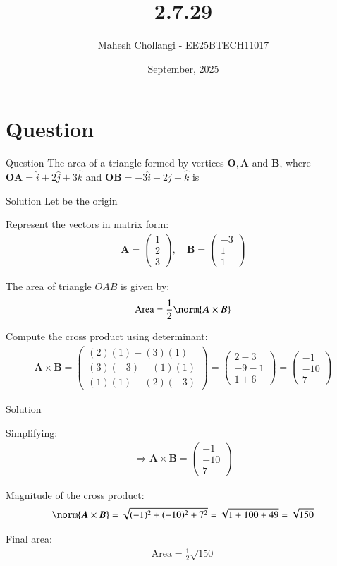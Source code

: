 \documentclass{beamer}
\title{2.7.29}
\date{September, 2025}
\author{Mahesh Chollangi - EE25BTECH11017}
\newcommand{\myvec}[1]{\ensuremath{\begin{pmatrix}#1\end{pmatrix}}}
\renewcommand{\vec}[1]{\boldsymbol{#1}} %
\begin{document}
\frame{\titlepage}

\section*{Question}
\begin{frame}{Question}
The area of a triangle formed by vertices $\vec{O}, \vec{A}$ and $\vec{B}$, where $\vec{OA} = \hat{i} + 2\hat{j} + 3\hat{k}$ and $\vec{OB} = -3\hat{i} - 2\hat{j} + \hat{k}$ is
\end{frame}

\begin{frame}{Solution}
Let \vec{O} be the origin

Represent the vectors in matrix form:
\begin{align}
\vec{A} = \myvec{1 \\ 2 \\ 3}, \quad
\vec{B} = \myvec{-3 \\ 1 \\ 1}
\end{align}

The area of triangle $OAB$ is given by:
\begin{align}
\text{Area} = \frac{1}{2} \norm{\vec{A} \times \vec{B}}
\end{align}

Compute the cross product using determinant:
\begin{align}
\vec{A} \times \vec{B} =
\myvec{
(2)(1) - (3)(1) \\
(3)(-3) - (1)(1) \\
(1)(1) - (2)(-3)
}
=
\myvec{
2 - 3 \\
-9 - 1 \\
1 + 6
}
=
\myvec{
-1 \\
-10 \\
7
}
\end{align}

\end{frame}

\begin{frame}{Solution}

Simplifying:
\begin{align}
\Rightarrow \vec{A} \times \vec{B} = \myvec{-1 \\ -10 \\ 7}
\end{align}

Magnitude of the cross product:
\begin{align}
\norm{\vec{A} \times \vec{B}} = \sqrt{(-1)^2 + (-10)^2 + 7^2} = \sqrt{1 + 100 + 49} = \sqrt{150}
\end{align}

Final area:
\begin{align}
\text{Area} = \frac{1}{2} \sqrt{150}
\end{align}

\end{frame}
\end{document}
